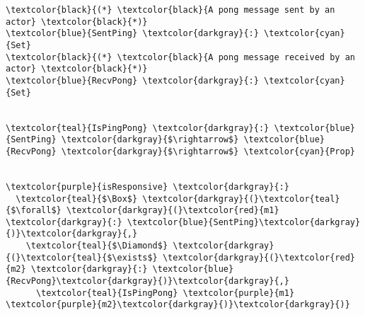 \begin{Verbatim}[commandchars=\\\{\},codes={\catcode`$=3},fontsize=\small]
\textcolor{black}{(*} \textcolor{black}{A pong message sent by an actor} \textcolor{black}{*)}
\textcolor{blue}{SentPing} \textcolor{darkgray}{:} \textcolor{cyan}{Set}
\textcolor{black}{(*} \textcolor{black}{A pong message received by an actor} \textcolor{black}{*)}
\textcolor{blue}{RecvPong} \textcolor{darkgray}{:} \textcolor{cyan}{Set}


\textcolor{teal}{IsPingPong} \textcolor{darkgray}{:} \textcolor{blue}{SentPing} \textcolor{darkgray}{$\rightarrow$} \textcolor{blue}{RecvPong} \textcolor{darkgray}{$\rightarrow$} \textcolor{cyan}{Prop}


\textcolor{purple}{isResponsive} \textcolor{darkgray}{:} 
  \textcolor{teal}{$\Box$} \textcolor{darkgray}{(}\textcolor{teal}{$\forall$} \textcolor{darkgray}{(}\textcolor{red}{m1} \textcolor{darkgray}{:} \textcolor{blue}{SentPing}\textcolor{darkgray}{)}\textcolor{darkgray}{,} 
    \textcolor{teal}{$\Diamond$} \textcolor{darkgray}{(}\textcolor{teal}{$\exists$} \textcolor{darkgray}{(}\textcolor{red}{m2} \textcolor{darkgray}{:} \textcolor{blue}{RecvPong}\textcolor{darkgray}{)}\textcolor{darkgray}{,} 
      \textcolor{teal}{IsPingPong} \textcolor{purple}{m1} \textcolor{purple}{m2}\textcolor{darkgray}{)}\textcolor{darkgray}{)}
\end{Verbatim}
